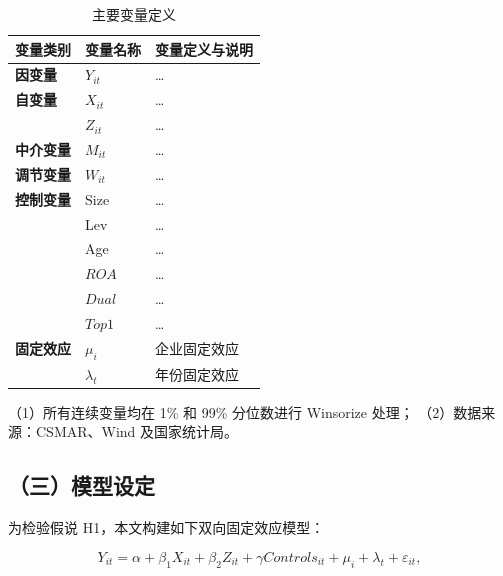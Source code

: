\documentclass[lang=cn, aaffiliation={中国}]{ctexart}
\begin{document}
\begin{table}[htbp]
    \centering
    \caption{主要变量定义}
    \label{tab:var_def}
    \begin{threeparttable}
        \begin{tabular}{p{2.2cm}p{2.0cm}p{6.3cm}}
            \toprule
            \textbf{变量类别} & \textbf{变量名称} & \textbf{变量定义与说明} \\
            \midrule
            \textbf{因变量} & $Y_{it}$ & \dots \\
            \midrule
            \textbf{自变量} & $X_{it}$ & \dots \\
              & $Z_{it}$ & \dots \\
            \midrule
            \textbf{中介变量} & $M_{it}$ & \dots \\
            \midrule
            \textbf{调节变量} & $W_{it}$ & \dots \\
            \midrule
            \textbf{控制变量} & Size & \dots \\
              & Lev & \dots \\
              & Age & \dots \\
              & $ROA$ & \dots \\
              & $Dual$ & \dots \\
              & $Top1$ & \dots \\
            \midrule
            \textbf{固定效应} & $\mu_i$ & 企业固定效应 \\
              & $\lambda_t$ & 年份固定效应 \\
            \bottomrule
        \end{tabular}
        \begin{tablenotes}\footnotesize
            \item（1）所有连续变量均在 1\% 和 99\% 分位数进行 Winsorize 处理；
            （2）数据来源：CSMAR、Wind 及国家统计局。
        \end{tablenotes}
    \end{threeparttable}
\end{table}

\subsection{（三）模型设定}
\label{sec:model}

为检验假说 H1，本文构建如下双向固定效应模型：

\begin{equation}
    \label{eq:baseline}
    Y_{it} = \alpha + \beta_1 X_{it} + \beta_2 Z_{it} + \gamma Controls_{it} + \mu_i + \lambda_t + \varepsilon_{it},
\end{equation}
\end{document}
